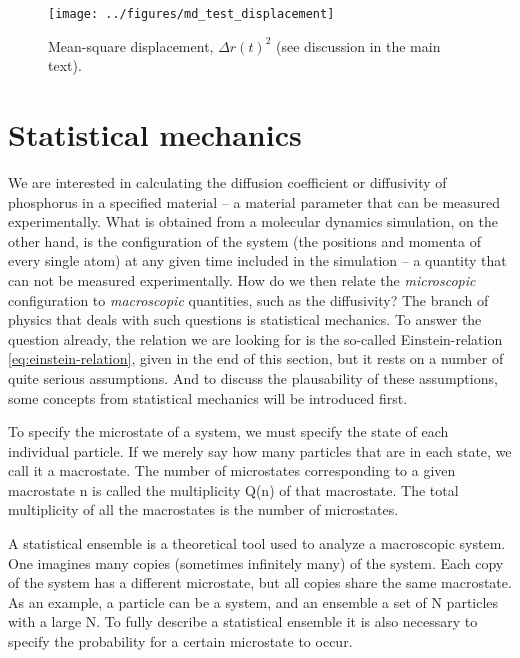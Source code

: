 \documentclass[11pt,bibliography=totoc,index=totoc]{scrbook}   %
\begin{document}
\begin{figure}[htbp]
  \begin{center}
    \texttt{[image: ../figures/md\_test\_displacement]}
  \end{center}
  \caption{Mean-square displacement, $\Delta r(t)^2$ (see discussion in the main text).}
  \label{fig:md_test_displacement}
\end{figure}

\section{Statistical mechanics}

We are interested in calculating the diffusion coefficient or diffusivity of phosphorus in a specified material -- 
a material parameter that can be measured experimentally.
What is obtained from a molecular dynamics simulation, on the other hand, is the configuration of the system (the positions and momenta of every single atom) at any given time included in the simulation -- a quantity that can not be measured experimentally. 
How do we then relate the \emph{microscopic} configuration to \emph{macroscopic} quantities, such as the diffusivity?
The branch of physics that deals with such questions is statistical mechanics. 
To answer the question already, the relation we are looking for is the so-called Einstein-relation \eqref{eq:einstein-relation}, given in the end of this section, but it rests on a number of quite serious assumptions. 
And to discuss the plausability of these assumptions, some concepts from statistical mechanics will be introduced first.

To specify the microstate of a system, we must specify the state of each individual particle. If we merely say how many particles that are in each state, we call it a macrostate. The number of microstates corresponding to a given macrostate n is called the multiplicity Q(n) of that macrostate. The total multiplicity of all the macrostates is the number of microstates.



A statistical ensemble is a theoretical tool used to analyze a macroscopic system. One imagines many copies (sometimes infinitely many) of the system. Each copy of the system has a different microstate, but all copies share the same macrostate. As an example, a particle can be a system, and an ensemble a set of N particles with a large N.
To fully describe a statistical ensemble it is also necessary to specify the probability for a certain microstate to occur.
\end{document}
